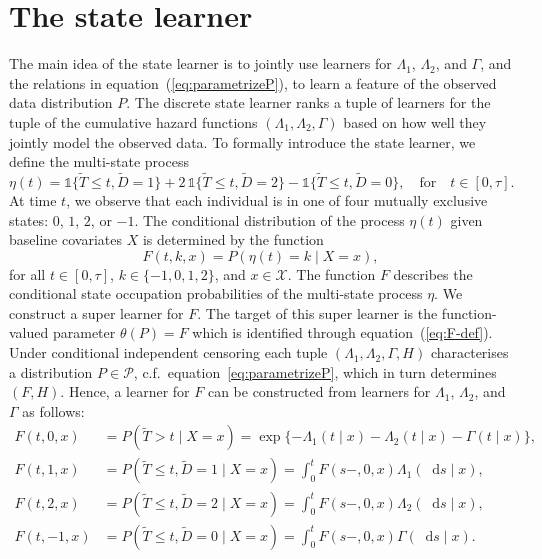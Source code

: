 \documentclass[a4paper,danish]{article}
\theoremstyle{plain} %
\numberwithin{theorem}{section}
\theoremstyle{definition} %
\theoremstyle{remark}
\newcommand*\diff{\mathop{}\!\mathrm{d}}
\newcommand{\1}{\mathds{1}}
\begin{document}
\section{The state learner}
\label{sec:super-learner-simple}

The main idea of the state learner is to jointly use learners
for \( \Lambda_1 \), \( \Lambda_2 \), and \( \Gamma \), and
the relations in equation~(\ref{eq:parametrizeP}), to learn a
feature of the observed data distribution \( P \). The
discrete state learner ranks a tuple of learners for the tuple
of the cumulative hazard functions
\( (\Lambda_1, \Lambda_2, \Gamma) \) based on how well they
jointly model the observed data. To formally introduce the
state learner, we define the multi-state process
\begin{equation*}
  \eta(t) = \1\{\tilde{T} \leq t, \tilde D=1\} + 2\,\1\{\tilde{T} \leq t, \tilde
  D=2\} - \1\{\tilde{T} \leq t, \tilde D=0\},
  \quad \text{for} \quad t \in [0, \tau].
\end{equation*}
At time \(t\), we observe that each individual is in one of four mutually
exclusive states: \( 0 \), \( 1 \), \( 2 \), or \( -1 \).
The conditional distribution of the process \( \eta(t) \) given
baseline covariates \( X \) is determined by the function
\begin{equation}
  \label{eq:F-def}
  F(t, k, x) = P(\eta(t) = k \mid X=x),
\end{equation}
for all \( t \in [0,\tau] \), \( k \in \{-1,0,1,2\} \), and
\( x \in \mathcal{X} \). The function \( F \) describes the
conditional state occupation probabilities of the multi-state
process \(\eta\). We construct a super learner for \( F \).
The target of this super learner is the function-valued
parameter $\theta(P) = F$ which is identified through
equation~(\ref{eq:F-def}). Under conditional independent
censoring each tuple $(\Lambda_{1}, \Lambda_{2}, \Gamma, H)$
characterises a distribution \(P\in\mathcal P\), c.f.\
equation~\eqref{eq:parametrizeP}, which in turn determines
\( (F, H) \). Hence, a learner for \( F \) can be constructed
from learners for \( \Lambda_1 \), \( \Lambda_2 \), and
$\Gamma$ as follows:
\begin{equation}\label{eq:transition}
  \begin{split}
    F(t, 0, x)
    &
      = P(\tilde{T} > t \mid X= x)
      =
      \exp{{\{-\Lambda_{1}(t \mid x)-\Lambda_{2}(t \mid x) - \Gamma(t \mid x)\}
      }},
    \\
    F(t, 1, x)
    &
      = P(\tilde{T} \leq t, \tilde{D}=1 \mid X=x)
      = \int_0^t F(s-, 0, x)  \Lambda_{1}(\diff s \mid x),
    \\
    F(t, 2, x)
    &
      = P(\tilde{T} \leq t, \tilde{D}=2 \mid X=x)
      = \int_0^t  F(s-, 0, x)  \Lambda_{2}(\diff s \mid x),
    \\
    F(t, -1, x)
    &
      = P(\tilde{T} \leq t, \tilde{D}=0 \mid X=x)
      = \int_0^t F(s-, 0, x)  \Gamma(\diff s \mid x).
  \end{split}
\end{equation}
\end{document}
